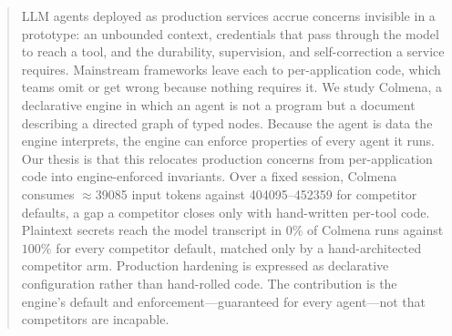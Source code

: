 \begin{abstract}
LLM agents deployed as production services accrue concerns invisible in a
prototype: an unbounded context, credentials that pass through the model to
reach a tool, and the durability, supervision, and self-correction a service
requires. Mainstream frameworks leave each to per-application code, which
teams omit or get wrong because nothing requires it. We study Colmena, a
declarative engine in which an agent is not a program but a document
describing a directed graph of typed nodes. Because the agent is
data the engine interprets, the engine can enforce properties of every agent
it runs. Our thesis is that this relocates production concerns from
per-application code into engine-enforced invariants. Over a fixed session,
Colmena consumes $\approx$\num{39085} input tokens against
\numrange{404095}{452359} for competitor defaults, a gap a competitor closes
only with hand-written per-tool code. Plaintext secrets reach the model
transcript in $0\%$ of Colmena runs against $100\%$ for every competitor
default, matched only by a hand-architected competitor arm. Production
hardening is expressed as declarative configuration rather than hand-rolled
code. The contribution is the engine's default and enforcement---guaranteed
for every agent---not that competitors are incapable.
\end{abstract}
